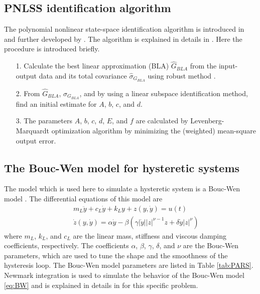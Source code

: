 \documentclass[review]{elsarticle}
\begin{document}
\subsection{PNLSS identification algorithm\label{PNLSSID}}
The polynomial nonlinear state-space identification algorithm is introduced in \citep{Paduart1} and further developed by \citep{Laurent1, Laurent2,Paduart3,Anna}. The algorithm is explained in details in \citep{Paduart4,Paduart1}. Here the procedure is introduced briefly.
\begin{itemize}
\item[1.] Calculate the best linear approximation (BLA)  $\hat{G}_{BLA}$ from the input-output data and its total covariance  $\hat{\sigma}_{G_{BLA}}$ using robust method \citep{Johan1,Johan2}.
\item[2.] From $\hat{G}_{BLA}$, $\hat{\sigma}_{G_{BLA}}$, and by using a linear subspace identification \citep{Rik1,van2012subspace} method, find an initial estimate for $A$, $b$, $c$, and $d$.
\item[3.] The parameters $A$, $b$, $c$, $d$, $E$, and $f$ are calculated by Levenberg-Marquardt optimization algorithm by minimizing the (weighted) mean-square output error.
\end{itemize}

\subsection{The Bouc-Wen model for hysteretic systems}\label{Sec:Hyster}
The model which is used here to simulate a hysteretic system is a Bouc-Wen model \citep{kyprianou2001identification,wen1976method}. The differential equations of this model are
\begin{eqnarray}
&&m_L \ddot{y} + c_L \dot{y} + k_L y + z(y,\dot{y}) = u(t) \nonumber \\
&&\dot{z}(y,\dot{y}) = \alpha \dot{y} - \beta (\gamma \left | \dot{y} \right | \left | z \right | ^{\nu -1}z + \delta \dot{y} \left | z \right |^{\nu})\label{eq:BW}
\end{eqnarray}
where $m_L$, $k_L$, and $c_L$ are the linear mass, stiffness and viscous damping coefficients, respectively. The coefficients $\alpha$, $\beta$, $\gamma$, $\delta$, and $\nu$ are the Bouc-Wen parameters, which are used to tune the shape and the smoothness of the hysteresis loop.
The Bouc-Wen model parameters are listed in Table \ref{tab:PARS}. 
Newmark integration \citep{newmark1959method,geradin2014mechanical} is used to simulate the behavior of the Bouc-Wen model \eqref{eq:BW} and is explained in details in \citep{Noel,Maarten} for this specific problem.
\end{document}
